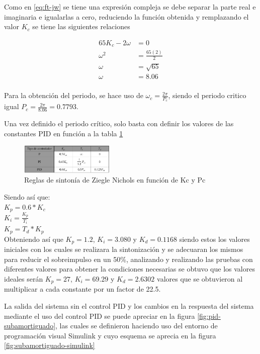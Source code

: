 \documentclass[conference]{IEEEtran}
\begin{document}
	Como en \ref{eq:ft-jw} se tiene una expresión compleja se debe separar la parte real e imaginaria e igualarlas a cero, reduciendo la función obtenida y remplazando el valor $K_c$ se tiene las siguientes relaciones
	
	\begin{align}
		65K_c - 2\omega &= 0 \\
		\omega^2 &= \frac{65(2)}{2} \\
		\omega &= \sqrt{65} \\
		\omega &= 8.06 \\
		\label{eq:frecuencia-critica}
	\end{align}
	
	Para la obtención del periodo, se hace uso de $\omega_c = \frac{2\pi}{P_c}$, siendo el periodo critico igual $P_c = \frac{2\pi}{8.06} = 0.7793 \label{eq:periodo-critico}$.
	
	Una vez definido el periodo crítico, solo basta con definir los valores de las constantes PID en función a la tabla \ref{fig:pid-reglas-2}
	
	\begin{figure}[h]
		\centering
		\includegraphics[width=0.4\textwidth]{media/pid-reglas-2}
		\caption{Reglas de sintonía de Ziegle Nichols en función de Kc y Pc}
		\label{fig:pid-reglas-2}
	\end{figure}
	
	Siendo así que: \\
	$K_p = 0.6*K_c$ \\
	$K_i = \frac{K_p}{T_i}$ \\
	$K_p = T_d*K_p$ \\
	
	Obteniendo así que $K_p = 1.2$, $K_i = 3.080$ y $K_d = 0.1168$ siendo estos los valores iniciales con los cuales se realizara la sintonización y se adecuaran los mismos para reducir el sobreimpulso en un 50\%, analizando y realizando las pruebas con diferentes valores para obtener la condiciones necesarias se obtuvo que los valores ideales serán $K_p = 27$, $K_i = 69.29$ y $K_d = 2.6302$ valores que se obtuvieron al multiplicar a cada constante por un factor de 22.5.
	
	La salida del sistema sin el control PID y los cambios en la respuesta del sistema mediante el uso del control PID se puede apreciar en la figura \ref{fig:pid-subamortiguado}, las cuales se definieron haciendo uso del entorno de programación visual Simulink y cuyo esquema se aprecia en la figura \ref{fig:subamortiguado-simulink}
	
\end{document}
